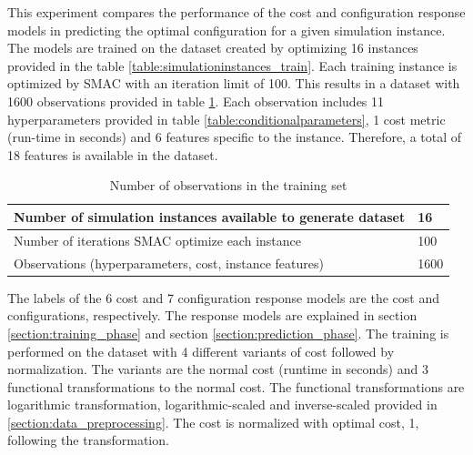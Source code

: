 This experiment compares the performance of the cost and configuration response models in predicting the optimal configuration for a given simulation instance. The models are trained on the dataset created by optimizing 16 instances provided in the table \ref{table:simulationinstances_train}. Each training instance is optimized by SMAC with an iteration limit of 100. This results in a dataset with 1600 observations provided in table \ref{table:trainingobservations}. Each observation includes 11 hyperparameters provided in table \ref{table:conditionalparameters}, 1 cost metric (run-time in seconds) and 6 features specific to the instance. Therefore, a total of 18 features is available in the dataset.

\begin{table}[!ht]
\centering
\begin{tabular}{|l|l|}
\hline
Number of simulation instances available to generate dataset & 16 \\ \hline
Number of iterations SMAC optimize each instance & 100 \\ \hline
Observations (hyperparameters, cost, instance features) & 1600 \\ \hline
\end{tabular}
\captionsetup{justification=justified}
\caption[Observations in the regression train set]{Number of observations in the training set}
\label{table:trainingobservations}
\end{table}

The labels of the 6 cost and 7 configuration response models are the cost and configurations, respectively. The response models are explained in section \ref{section:training_phase} and section \ref{section:prediction_phase}. The training is performed on the dataset with 4 different variants of cost followed by normalization. The variants are the normal cost (runtime in seconds) and 3 functional transformations to the normal cost. The functional transformations are logarithmic transformation, logarithmic-scaled and inverse-scaled provided in \ref{section:data_preprocessing}. The cost is normalized with optimal cost, 1, following the transformation.


